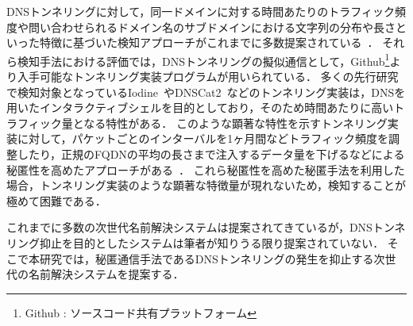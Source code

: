 DNSトンネリングに対して，同一ドメインに対する時間あたりのトラフィック頻度や問い合わせられるドメイン名のサブドメインにおける文字列の分布や長さといった特徴に基づいた検知アプローチがこれまでに多数提案されている~\cite{born, cheng, liu, asaf, steadman, jawad}．
それら検知手法における評価では，DNSトンネリングの擬似通信として，Github\footnote{Github : ソースコード共有プラットフォーム}より入手可能なトンネリング実装プログラムが用いられている．
多くの先行研究で検知対象となっているIodine~\cite{iodine}やDNSCat2~\cite{dnscat2}などのトンネリング実装は，DNSを用いたインタラクティブシェルを目的としており，そのため時間あたりに高いトラフィック量となる特性がある．
このような顕著な特性を示すトンネリング実装に対して，パケットごとのインターバルを1ヶ月間などトラフィック頻度を調整したり，正規のFQDNの平均の長さまで注入するデータ量を下げるなどによる秘匿性を高めたアプローチがある~\cite{asaf}．
これら秘匿性を高めた秘匿手法を利用した場合，トンネリング実装のような顕著な特徴量が現れないため，検知することが極めて困難である．

これまでに多数の次世代名前解決システムは提案されてきているが，DNSトンネリング抑止を目的としたシステムは筆者が知りうる限り提案されていない．
そこで本研究では，秘匿通信手法であるDNSトンネリングの発生を抑止する次世代の名前解決システムを提案する．


